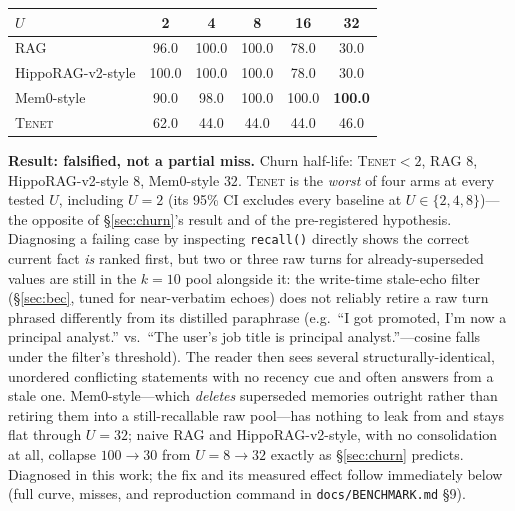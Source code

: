 \documentclass[11pt]{article}
\newcommand{\tenet}{\textsc{Tenet}}
\begin{document}
\begin{center}
\begin{tabular}{lccccc}
\toprule
$U$ & 2 & 4 & 8 & 16 & 32\\
\midrule
RAG & 96.0 & 100.0 & 100.0 & 78.0 & 30.0\\
HippoRAG-v2-style & 100.0 & 100.0 & 100.0 & 78.0 & 30.0\\
Mem0-style & 90.0 & 98.0 & 100.0 & 100.0 & \textbf{100.0}\\
\tenet{} & 62.0 & 44.0 & 44.0 & 44.0 & 46.0\\
\bottomrule
\end{tabular}
\end{center}

\textbf{Result: falsified, not a partial miss.} Churn half-life: \tenet{}${<}2$, RAG
$8$, HippoRAG-v2-style $8$, Mem0-style $32$. \tenet{} is the \emph{worst} of four arms at
every tested $U$, including $U{=}2$ (its 95\% CI excludes every baseline at $U{\in}\{2,4,8\}$)---the
opposite of \S\ref{sec:churn}'s result and of the pre-registered hypothesis. Diagnosing
a failing case by inspecting \texttt{recall()} directly shows the correct current fact
\emph{is} ranked first, but two or three raw turns for already-superseded values are
still in the $k{=}10$ pool alongside it: the write-time stale-echo filter
(\S\ref{sec:bec}, tuned for near-verbatim echoes) does not reliably retire a raw turn
phrased differently from its distilled paraphrase (e.g.\ ``I got promoted, I'm now a
principal analyst.'' vs.\ ``The user's job title is principal analyst.''---cosine falls
under the filter's threshold). The reader then sees several structurally-identical,
unordered conflicting statements with no recency cue and often answers from a stale one.
Mem0-style---which \emph{deletes} superseded memories outright rather than retiring them
into a still-recallable raw pool---has nothing to leak from and stays flat through
$U{=}32$; naive RAG and HippoRAG-v2-style, with no consolidation at all, collapse
$100\!\to\!30$ from $U{=}8\!\to\!32$ exactly as \S\ref{sec:churn} predicts. Diagnosed in
this work; the fix and its measured effect follow immediately below (full curve,
misses, and reproduction command in \texttt{docs/BENCHMARK.md} \S9).
\end{document}

